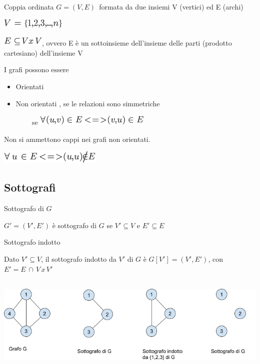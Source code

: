 \documentclass{article}
\providecommand{\tightlist}{%
  \setlength{\itemsep}{0pt}\setlength{\parskip}{0pt}}
\begin{document}
{{Coppia ordinata }$G=(V,E)${~formata da due
insiemi V (vertici) ed E (archi)}

\includegraphics{images/image336.png}

\includegraphics{images/image337.png}{, ovvero E è un sottoinsieme
dell'insieme delle parti (prodotto cartesiano) dell'insieme V}

{}

{I grafi possono essere}

\begin{itemize}
\tightlist
\item
  {Orientati}
\item
  {Non orientati , se le relazioni sono simmetriche}
\end{itemize}

{~~~~~~~~se }\includegraphics{images/image338.png}



{Non si ammettono cappi nei grafi non orientati.}

\includegraphics{images/image339.png}

{}

\hypertarget{h.5gj1hs8i1ooy}{\subsection{\texorpdfstring{{Sottografi}}{Sottografi}}\label{h.5gj1hs8i1ooy}}

{Sottografo di }$G$

{$G'=(V',E')$ è sottografo di $G$ se $V'\subseteq V$ e $E'\subseteq E$}

{Sottografo indotto }

{Dato $V' \subseteq V$, il sottografo indotto da $V'$ di $G$ è $G[V']=(V',E')$, con $E' = E\,\cap\,V\,x\,V'$}

\subsection{\texorpdfstring{{\protect\includegraphics{images/image534.png}}}{}}\label{h.alw0becdzne2}

}
\end{document}
